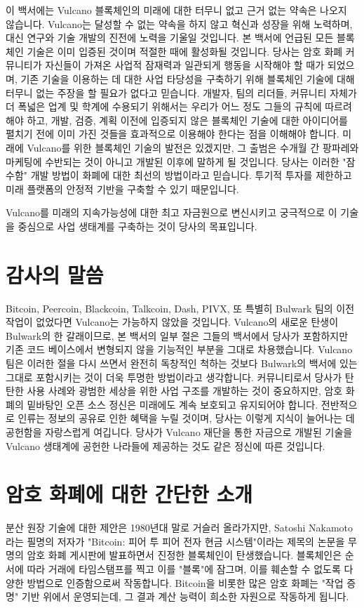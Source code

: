 \documentclass[A4paper, 12pt]{article}
\begin{document}
이 백서에는 Vulcano 블록체인의 미래에 대한 터무니 없고 근거 없는 약속은 나오지 않습니다. Vulcano는 달성할 수 없는 약속을 하지 않고 혁신과 성장을 위해 노력하며, 대신 연구와 기술 개발의 진전에 노력을 기울일 것입니다. 본 백서에 언급된 모든 블록체인 기술은 이미 입증된 것이며 적절한 때에 활성화될 것입니다. 당사는 암호 화폐 커뮤니티가 자신들이 가져온 사업적 잠재력과 일관되게 행동을 시작해야 할 때가 되었으며, 기존 기술을 이용하는 데 대한 사업 타당성을 구축하기 위해 블록체인 기술에 대해 터무니 없는 주장을 할 필요가 없다고 믿습니다. 개발자, 팀의 리더들, 커뮤니티 자체가 더 폭넓은 업계 및 학계에 수용되기 위해서는 우리가 어느 정도 그들의 규칙에 따르려 해야 하고, 개발, 검증, 계획 이전에 입증되지 않은 블록체인 기술에 대한 아이디어를 펼치기 전에 이미 가진 것들을 효과적으로 이용해야 한다는 점을 이해해야 합니다. 미래에 Vulcano를 위한 블록체인 기술의 발전은 있겠지만, 그 출범은 수개월 간 팡파레와 마케팅에 수반되는 것이 아니고 개발된 이후에 말하게 될 것입니다. 당사는 이러한 "잠수함" 개발 방법이 화폐에 대한 최선의 방법이라고 믿습니다. 투기적 투자를 제한하고 미래 플랫폼의 안정적 기반을 구축할 수 있기 때문입니다.

Vulcano를 미래의 지속가능성에 대한 최고 자금원으로 변신시키고 궁극적으로 이 기술을 중심으로 사업 생태계를 구축하는 것이 당사의 목표입니다.

\section{감사의 말씀}
Bitcoin, Peercoin, Blackcoin, Talkcoin, Dash, PIVX, 또 특별히 Bulwark 팀의 이전 작업이 없었다면 Vulcano는 가능하지 않았을 것입니다. Vulcano의 새로운 탄생이 Bulwark의 한 갈래이므로, 본 백서의 일부 절은 그들의 백서에서 당사가 포함하지만 기존 코드 베이스에서 변형되지 않을 기능적인 부분을 그대로 차용했습니다. Vulcano 팀은 이러한 절을 다시 쓰면서 완전히 독창적인 척하는 것보다 Bulwark의 백서에 있는 그대로 포함시키는 것이 더욱 투명한 방법이라고 생각합니다.  커뮤니티로서 당사가 탄탄한 사용 사례와 광범한 세상을 위한 사업 구조를 개발하는 것이 중요하지만, 암호 화폐의 밑바탕인 오픈 소스 정신은 미래에도 계속 보호되고 유지되어야 합니다.  전반적으로 인류는 정보의 공유로 인한 혜택을 누릴 것이며, 당사는 이렇게 지식이 늘어나는 데 공헌함을 자랑스럽게 여깁니다. 당사가 Vulcano 재단을 통한 자금으로 개발된 기술을 Vulcano 생태계에 공헌한 나라들에 제공하는 것도 같은 정신에 따른 것입니다.

\section{암호 화폐에 대한 간단한 소개}
분산 원장 기술에 대한 제안은 1980년대 말로 거슬러 올라가지만, Satoshi Nakamoto라는 필명의 저자가 "Bitcoin: 피어 투 피어 전자 현금 시스템"이라는 제목의 논문을 무명의 암호 화폐 게시판에 발표하면서 진정한 블록체인이 탄생했습니다. 블록체인은 순서에 따라 거래에 타임스탬프를 찍고 이를 "블록"에 잠그며, 이를 훼손할 수 없도록 다양한 방법으로 인증함으로써 작동합니다. Bitcoin을 비롯한 많은 암호 화폐는 "작업 증명" 기반 위에서 운영되는데, 그 결과 계산 능력이 희소한 자원으로 작동하게 됩니다.
\end{document}
